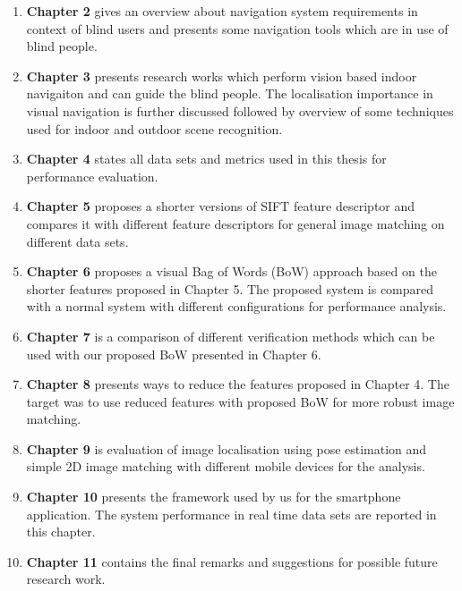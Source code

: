 \begin{enumerate}
\item \textbf{Chapter 2} gives an overview about 
navigation system requirements in context 
of blind users and presents some navigation 
tools which are in use of blind people.

\item \textbf{Chapter 3} presents research works 
which perform vision based indoor navigaiton 
and can guide the blind people. The localisation 
importance in visual navigation is further discussed followed 
by overview of some techniques used for indoor and 
outdoor scene recognition. 

\item \textbf{Chapter 4} states all data sets 
and metrics used in this thesis for performance 
evaluation. 

\item \textbf{Chapter 5} proposes a shorter versions of SIFT 
feature descriptor and compares it 
with different feature descriptors 
for general image matching on different data sets.

 \item \textbf{Chapter 6} proposes a visual Bag of Words (BoW) 
approach based on the shorter features proposed 
in Chapter 5. The proposed system is compared with 
a normal system with different configurations for 
performance analysis.

\item \textbf{Chapter 7} is a comparison 
of different verification methods 
which can be used with our proposed BoW presented 
in Chapter 6.

\item \textbf{Chapter 8} presents ways to reduce the 
features proposed in Chapter 4. The target 
was to use reduced features with proposed BoW 
for more robust image matching.

\item \textbf{Chapter 9} is evaluation of image localisation 
using pose estimation and simple 2D image matching 
with different mobile devices for the analysis. 

\item \textbf{Chapter 10} presents the framework 
used by us for the smartphone application. 
The system performance in real time data sets 
are reported in this chapter.

\item \textbf{Chapter 11} contains the final remarks 
and suggestions for possible future research work. 

\end{enumerate}

